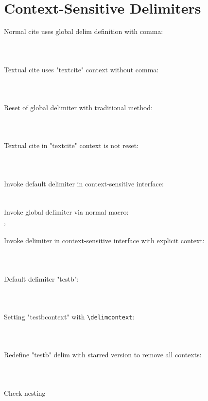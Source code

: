 \documentclass[a4paper]{article}
\newcommand{\cmd}[1]{\texttt{\textbackslash #1}}
\begin{document}
\section*{Context-Sensitive Delimiters}

Normal cite uses global delim definition with comma:\\\\
\cite{averroes/hannes}\\\\
Textual cite uses "textcite" context without comma:\\\\
\textcite{averroes/hannes}\\\\
Reset of global delimiter with traditional method:\\\\
\renewcommand*{\nametitledelim}{\addcomma\space}
\cite{averroes/hannes}\\\\
Textual cite in "textcite" context is not reset:\\\\
\textcite{averroes/hannes}\\\\
\begingroup
\def\addcomma{,}
\let\space\textvisiblespace
Invoke default delimiter in context-sensitive interface:\\
\\\\
Invoke global delimiter via normal macro:\\
\nametitledelim\\\\
Invoke delimiter in context-sensitive interface with explicit context:\\\\
\\\\
\endgroup
Default delimiter "testb":\\\\
\\\\
Setting "testbcontext" with \cmd{delimcontext}:\\\\
\\\\
Redefine "testb" delim with starred version to remove all contexts:\\\\
\\\\
Check nesting\\\\
\begingroup
{}\\\\
\endgroup
{}\\\\
\printbibliography
\end{document}
